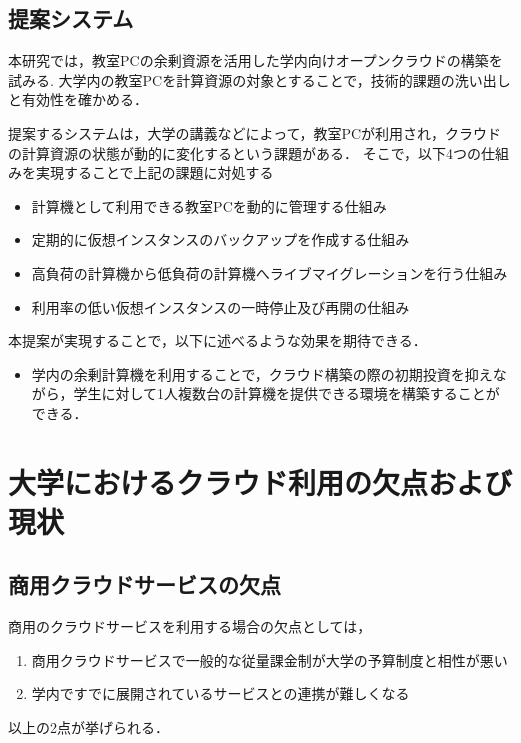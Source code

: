 \documentclass[11pt,a4paper]{jsarticle}
\begin{document}
\subsection{提案システム}
本研究では，教室PCの余剰資源を活用した学内向けオープンクラウドの構築を試みる.
大学内の教室PCを計算資源の対象とすることで，技術的課題の洗い出しと有効性を確かめる．
\par 提案するシステムは，大学の講義などによって，教室PCが利用され，クラウドの計算資源の状態が動的に変化するという課題がある．
そこで，以下4つの仕組みを実現することで上記の課題に対処する
\begin{itemize}
	\item 計算機として利用できる教室PCを動的に管理する仕組み
	\item 定期的に仮想インスタンスのバックアップを作成する仕組み
	\item 高負荷の計算機から低負荷の計算機へライブマイグレーションを行う仕組み
	\item 利用率の低い仮想インスタンスの一時停止及び再開の仕組み
\end{itemize}

\par 本提案が実現することで，以下に述べるような効果を期待できる．
\begin{itemize}
	\item 学内の余剰計算機を利用することで，クラウド構築の際の初期投資を抑えながら，学生に対して1人複数台の計算機を提供できる環境を構築することができる．
\end{itemize}


\section{大学におけるクラウド利用の欠点および現状}
\subsection{商用クラウドサービスの欠点}
商用のクラウドサービスを利用する場合の欠点としては，
\begin{enumerate}
	\item 商用クラウドサービスで一般的な従量課金制が大学の予算制度と相性が悪い
	\item 学内ですでに展開されているサービスとの連携が難しくなる
\end{enumerate}
以上の2点が挙げられる．
\end{document}
